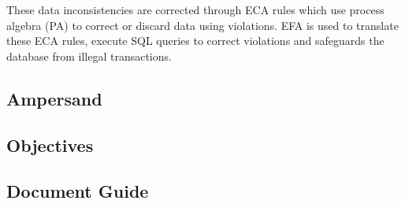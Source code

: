 \documentclass[journal,12pt,onecolumn,draftclsnofoot]{article}
\let\Oldsubsection\subsection
\renewcommand{\subsection}{\FloatBarrier\Oldsubsection}
\begin{document}
These data inconsistencies are corrected through ECA rules which use process 
algebra (PA) to correct or discard data using violations. EFA is used to 
translate these ECA rules, execute SQL queries to correct violations and 
safeguards the database from illegal transactions.

\subsection{Ampersand}
\subsection{Objectives}
\subsection{Document Guide}
\end{document}
